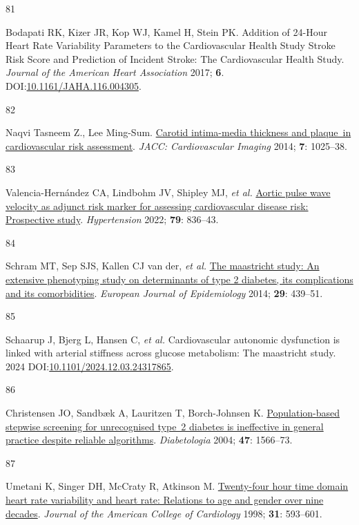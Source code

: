 \documentclass[
  a4paper,
  headsepline=true,
  open=left]{scrbook}
\newlength{\cslhangindent}
\newlength{\csllabelwidth}
\newlength{\cslentryspacingunit} %
\newenvironment{CSLReferences}[2] %
 {%
  \setlength{\parindent}{0pt}
  \ifodd #1
  \let\oldpar\par
  \def\par{\hangindent=\cslhangindent\oldpar}
  \fi
  \setlength{\parskip}{#2\cslentryspacingunit}
 }%
 {}
\newcommand{\CSLLeftMargin}[1]{\parbox[t]{\csllabelwidth}{#1}}
\newcommand{\CSLRightInline}[1]{\parbox[t]{\linewidth - \csllabelwidth}{#1}\break}
\begin{document}
\begin{CSLReferences}{0}{0}
\leavevmode{}%
\CSLLeftMargin{81 }%
\CSLRightInline{Bodapati RK, Kizer JR, Kop WJ, Kamel H, Stein PK.
Addition of 24-Hour Heart Rate Variability Parameters to the
Cardiovascular Health Study Stroke Risk Score and Prediction of Incident
Stroke: The Cardiovascular Health Study. \emph{Journal of the American
Heart Association} 2017; \textbf{6}.
DOI:\href{https://doi.org/10.1161/JAHA.116.004305}{10.1161/JAHA.116.004305}.}

\leavevmode{}%
\CSLLeftMargin{82 }%
\CSLRightInline{Naqvi Tasneem Z., Lee Ming-Sum.
\href{https://doi.org/10.1016/j.jcmg.2013.11.014}{Carotid intima-media
thickness and plaque~in cardiovascular risk assessment}. \emph{JACC:
Cardiovascular Imaging} 2014; \textbf{7}: 1025--38.}

\leavevmode{}%
\CSLLeftMargin{83 }%
\CSLRightInline{Valencia-Hernández CA, Lindbohm JV, Shipley MJ, \emph{et
al.} \href{https://doi.org/10.1161/HYPERTENSIONAHA.121.17589}{Aortic
pulse wave velocity as adjunct risk marker for assessing cardiovascular
disease risk: Prospective study}. \emph{Hypertension} 2022; \textbf{79}:
836--43.}

\leavevmode{}%
\CSLLeftMargin{84 }%
\CSLRightInline{Schram MT, Sep SJS, Kallen CJ van der, \emph{et al.}
\href{https://doi.org/10.1007/s10654-014-9889-0}{The maastricht study:
An extensive phenotyping study on determinants of type 2 diabetes, its
complications and its comorbidities}. \emph{European Journal of
Epidemiology} 2014; \textbf{29}: 439--51.}

\leavevmode{}%
\CSLLeftMargin{85 }%
\CSLRightInline{Schaarup J, Bjerg L, Hansen C, \emph{et al.}
Cardiovascular autonomic dysfunction is linked with arterial stiffness
across glucose metabolism: The maastricht study. 2024
DOI:\href{https://doi.org/10.1101/2024.12.03.24317865}{10.1101/2024.12.03.24317865}.}

\leavevmode{}%
\CSLLeftMargin{86 }%
\CSLRightInline{Christensen JO, Sandbæk A, Lauritzen T, Borch-Johnsen K.
\href{https://doi.org/10.1007/s00125-004-1496-2}{Population-based
stepwise screening for unrecognised type~2 diabetes is ineffective in
general practice despite reliable algorithms}. \emph{Diabetologia} 2004;
\textbf{47}: 1566--73.}

\leavevmode{}%
\CSLLeftMargin{87 }%
\CSLRightInline{Umetani K, Singer DH, McCraty R, Atkinson M.
\href{https://doi.org/10.1016/S0735-1097(97)00554-8}{Twenty-four hour
time domain heart rate variability and heart rate: Relations to age and
gender over nine decades}. \emph{Journal of the American College of
Cardiology} 1998; \textbf{31}: 593--601.}


\end{CSLReferences}
\end{document}
